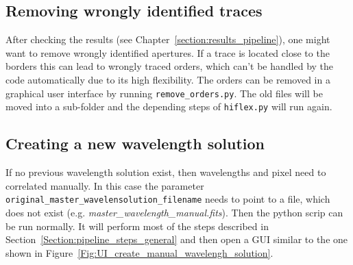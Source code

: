 \documentclass[10pt,a4paper]{article}
\begin{document}
\subsection{Removing wrongly identified traces}
After checking the results (see Chapter~\ref{section:results_pipeline}), one might want to remove wrongly identified apertures. If a trace is located close to the borders this can lead to wrongly traced orders, which can't be handled by the code automatically due to its high flexibility. The orders can be removed in a graphical user interface by running \verb|remove_orders.py|. The old files will be moved into a sub-folder and the depending steps of \verb|hiflex.py| will run again.


\subsection{Creating a new wavelength solution}
\label{section:create_new_wave_solution}
If no previous wavelength solution exist, then wavelengths and pixel need to correlated manually. In this case the parameter \verb|original_master_wavelensolution_filename| needs to point to a file, which does not exist (e.g. \textit{master\_wavelength\_manual.fits}). Then the python scrip can be run normally. It will perform most of the steps described in Section~\ref{Section:pipeline_steps_general} and then open a GUI similar to the one shown in Figure~\ref{Fig:UI_create_manual_wavelengh_solution}.
\end{document}
